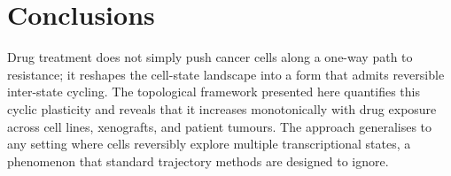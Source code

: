 \section{Conclusions}

Drug treatment does not simply push cancer cells along a one-way path
to resistance; it reshapes the cell-state landscape into a form that
admits reversible inter-state cycling. The topological framework
presented here quantifies this cyclic plasticity and reveals that it
increases monotonically with drug exposure across cell lines, xenografts,
and patient tumours. The approach generalises to any setting where cells
reversibly explore multiple transcriptional states, a phenomenon that
standard trajectory methods are designed to ignore.
